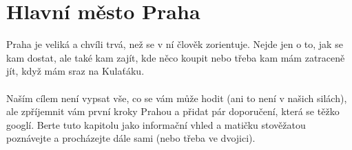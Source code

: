 \section{Hlavní město Praha}
Praha je veliká a chvíli trvá, než se v ní člověk zorientuje. Nejde jen o to,
jak se kam dostat, ale také kam zajít, kde něco koupit nebo třeba kam mám
zatraceně jít, když mám sraz na Kulaťáku.
\\\\
Naším cílem není vypsat vše, co se vám může hodit (ani to není v našich silách),
ale zpříjemnit vám první kroky Prahou a přidat pár doporučení, která se těžko
googlí. Berte tuto kapitolu jako informační vhled a matičku stověžatou
poznávejte a procházejte dále sami (nebo třeba ve dvojici).